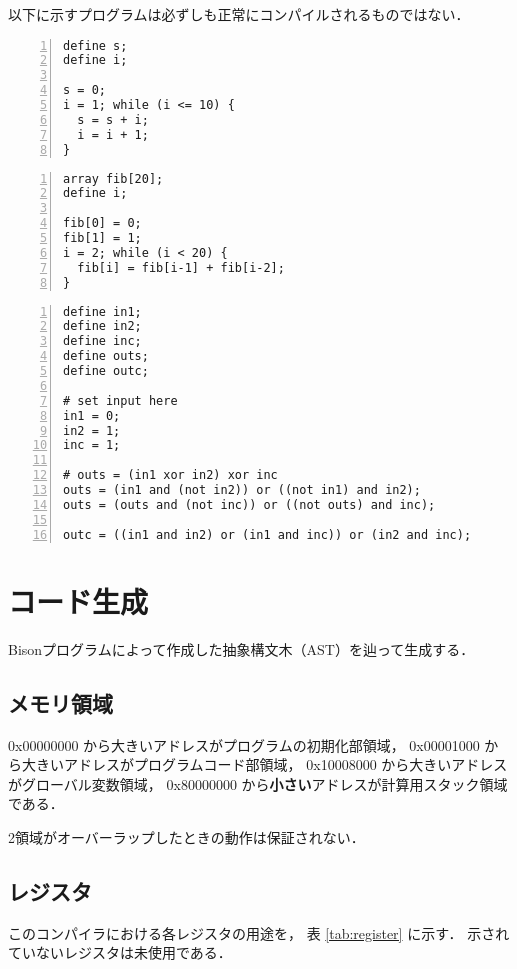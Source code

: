 \documentclass[lualatex, a4paper, ja=standard]{bxjsarticle}
\begin{document}
以下に示すプログラムは必ずしも正常にコンパイルされるものではない．

\begin{Verbatim}[frame=lines, numbers=left]
define s;
define i;

s = 0;
i = 1; while (i <= 10) {
  s = s + i;
  i = i + 1;
}
\end{Verbatim}

\begin{Verbatim}[frame=lines, numbers=left]
array fib[20];
define i;

fib[0] = 0;
fib[1] = 1;
i = 2; while (i < 20) {
  fib[i] = fib[i-1] + fib[i-2];
}
\end{Verbatim}

\begin{Verbatim}[frame=lines, numbers=left]
define in1;
define in2;
define inc;
define outs;
define outc;

# set input here
in1 = 0;
in2 = 1;
inc = 1;

# outs = (in1 xor in2) xor inc
outs = (in1 and (not in2)) or ((not in1) and in2);
outs = (outs and (not inc)) or ((not outs) and inc);

outc = ((in1 and in2) or (in1 and inc)) or (in2 and inc);
\end{Verbatim}

\section{コード生成}

Bisonプログラムによって作成した抽象構文木（AST）を辿って生成する．

\subsection{メモリ領域}

0x00000000 から大きいアドレスがプログラムの初期化部領域，
0x00001000 から大きいアドレスがプログラムコード部領域，
0x10008000 から大きいアドレスがグローバル変数領域，
0x80000000 から\textbf{小さい}アドレスが計算用スタック領域である．

2領域がオーバーラップしたときの動作は保証されない．

\subsection{レジスタ}

このコンパイラにおける各レジスタの用途を，
表 \ref{tab:register} に示す．
示されていないレジスタは未使用である．
\end{document}
